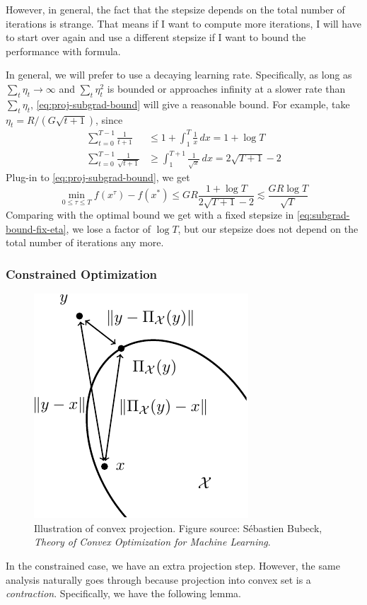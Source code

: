\documentclass{scrartcl}
\begin{document}
However, in general, the fact that the stepsize depends on the total number of iterations is
strange. That means if I want to compute more iterations, I will have to start over again and use a
different stepsize if I want to bound the performance with formula.

In general, we will prefer to use a decaying learning rate. Specifically, as long as
$\sum_t\eta_t\rightarrow \infty$ and $\sum_t\eta_t^2$ is bounded or approaches infinity at a slower
rate than $\sum_t\eta_t$, \eqref{eq:proj-subgrad-bound} will give a reasonable bound. For example,
take $\eta_t=R/(G\sqrt{t+1})$, since
\[
\begin{aligned}
  \sum_{t=0}^{T-1} \frac{1}{t+1} &\leq 1 + \int_1^{T} \frac{1}{x}\,dx = 1 + \log T \\
  \sum_{t=0}^{T-1} \frac{1}{\sqrt{t+1}} &\geq \int_1^{T+1}\frac{1} {\sqrt{x}}\,dx =
  2\sqrt{T+1}-2
\end{aligned}
\]
Plug-in to \eqref{eq:proj-subgrad-bound}, we get
\begin{equation}
  \min_{0\leq \tau \leq T} f(x^\tau) - f(x^*) \leq GR \frac{1+\log T}{2\sqrt{T+1}-2} \lesssim \frac
  {GR\log T}{\sqrt{T}}
\end{equation}
Comparing with the optimal bound we get with a fixed stepsize in \eqref{eq:subgrad-bound-fix-eta},
we lose a factor of $\log T$, but our stepsize does not depend on the total number of iterations any
more.

\subsubsection{Constrained Optimization}

\begin{figure}
\centering
\includegraphics[width=.8\linewidth]{figs/convex-projection}
\caption{Illustration of convex projection. Figure source: S{\'e}bastien Bubeck, \emph{Theory of
Convex Optimization for Machine Learning}.}
\end{figure}
In the constrained case, we have an extra projection step. However, the same analysis naturally goes
through because projection into convex set is a \emph{contraction}. Specifically, we have the
following lemma.
\end{document}
